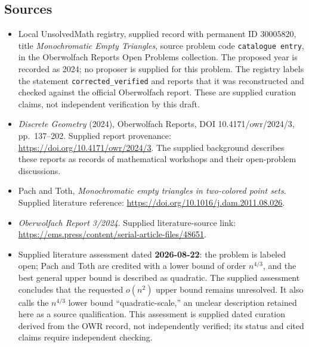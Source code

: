 \documentclass[11pt]{article}
\begin{document}
\subsection{Sources}
\begin{itemize}
\item Local UnsolvedMath registry, supplied record with permanent ID \(30005820\), title \emph{Monochromatic Empty Triangles}, source problem code \texttt{catalogue entry}, in the Oberwolfach Reports Open Problems collection. The proposed year is recorded as 2024; no proposer is supplied for this problem. The registry labels the statement \texttt{corrected\_verified} and reports that it was reconstructed and checked against the official Oberwolfach report. These are supplied curation claims, not independent verification by this draft.
\item \emph{Discrete Geometry} (2024), Oberwolfach Reports, DOI 10.4171/owr/2024/3, pp.\ 137--202. Supplied report provenance: \url{https://doi.org/10.4171/owr/2024/3}. The supplied background describes these reports as records of mathematical workshops and their open-problem discussions.
\item Pach and Toth, \emph{Monochromatic empty triangles in two-colored point sets}. Supplied literature reference: \url{https://doi.org/10.1016/j.dam.2011.08.026}.
\item \emph{Oberwolfach Report 3/2024}. Supplied literature-source link: \url{https://ems.press/content/serial-article-files/48651}.
\item Supplied literature assessment dated \textbf{2026-08-22}: the problem is labeled open; Pach and Toth are credited with a lower bound of order \(n^{4/3}\), and the best general upper bound is described as quadratic. The supplied assessment concludes that the requested \(o(n^2)\) upper bound remains unresolved. It also calls the \(n^{4/3}\) lower bound ``quadratic-scale,'' an unclear description retained here as a source qualification. This assessment is supplied dated curation derived from the OWR record, not independently verified; its status and cited claims require independent checking.
\end{itemize}
\end{document}
